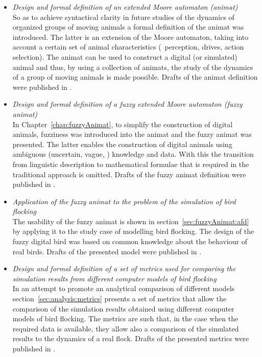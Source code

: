 \begin{itemize}
%
\item \emph{Design and formal definition of an extended Moore automaton (animat)}\\
So as to achieve syntactical clarity in future studies of the dynamics of organized groups of moving animals a formal definition of the animat was introduced. The latter is an extension of the Moore automaton, taking into account a certain set of animal characteristics (\ie\ perception, drives, action selection). The animat can be used to construct a digital (or simulated) animal and thus, by using a collection of animats, the study of the dynamics of a group of moving animals is made possible. Drafts of the animat definition were published in \cite{lebar_bajec:2002,lebar_bajec:2003a,lebar_bajec:2003b,mraz:2004}.
%
\item \emph{Design and formal definition of a fuzzy extended Moore automaton (fuzzy animat)}\\
In Chapter~\ref{chap:fuzzyAnimat}, to simplify the construction of digital animals, fuzziness was introduced into the animat and the fuzzy animat was presented. The latter enables the construction of digital animals using ambiguous (uncertain, vague, \etc) knowledge and data. With this the transition from linguistic description to mathematical formulae that is required in the traditional approach is omitted. Drafts of the fuzzy animat definition were published in \cite{lebar_bajec:2003a,lebar_bajec:2003b,mraz:2004}.
%
\item \emph{Application of the fuzzy animat to the problem of the simulation of bird flocking}\\
The usability of the fuzzy animat is shown in section~\ref{sec:fuzzyAnimat:afd} by applying it to the study case of modelling bird flocking. The design of the fuzzy digital bird was based on common knowledge about the behaviour of real birds. Drafts of the presented model were published in \cite{lebar_bajec:2003a,lebar_bajec:2003b,lebar_bajec:2005a}.
%
\item \emph{Design and formal definition of a set of metrics used for comparing the simulation results from different computer models of bird flocking}\\
In an attempt to promote an analytical comparison of different models section~\ref{sec:analysis:metrics} presents a set of metrics that allow the comparison of the simulation results obtained using different computer models of bird flocking. The metrics are such that, in the case when the required data is available, they allow also a comparison of the simulated results to the dynamics of a real flock. Drafts of the presented metrics were published in \cite{lebar_bajec:2002,lebar_bajec:2003a,lebar_bajec:2003b,lebar_bajec:2005a}.

\end{itemize}
